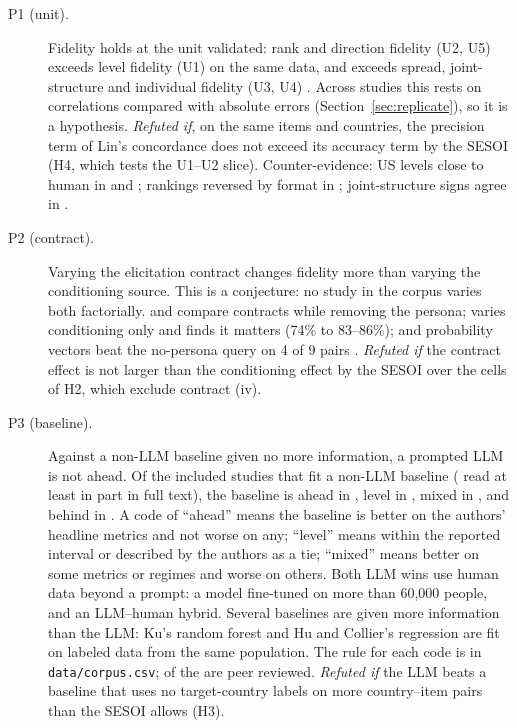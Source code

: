 \documentclass[11pt]{article}
\begin{document}
\begin{description}
  \item[P1 (unit).] Fidelity holds at the unit validated: rank and direction fidelity (U2, U5) exceeds level fidelity (U1) on the same data, and exceeds spread, joint-structure and individual fidelity (U3, U4) \citep{wang2026ess,williams2026beyond,ashokkumar2026,kim2026korean}. Across studies this rests on correlations compared with absolute errors (Section~\ref{sec:replicate}), so it is a hypothesis. \emph{Refuted if}, on the same items and countries, the precision term of Lin's concordance does not exceed its accuracy term by the SESOI (H4, which tests the U1--U2 slice). Counter-evidence: US levels close to human in \citet{bisbee2024} and \citet{lam2026fast}; rankings reversed by format in \citet{wang2026ess}; joint-structure signs agree in \citet{lee2026openweight}.
  \item[P2 (contract).] Varying the elicitation contract changes fidelity more than varying the conditioning source. This is a conjecture: no study in the corpus varies both factorially. \citet{jang2026} and \citet{doudkin2026} compare contracts while removing the persona; \citet{park2024} varies conditioning only and finds it matters (74\% to 83--86\%); and probability vectors beat the no-persona query on 4 of 9 pairs \citep{doudkin2026}. \emph{Refuted if} the contract effect is not larger than the conditioning effect by the SESOI over the cells of H2, which exclude contract (iv).
  \item[P3 (baseline).] Against a non-LLM baseline given no more information, a prompted LLM is not ahead. Of the \cBase{} included studies that fit a non-LLM baseline (\cBaseReadOK{} read at least in part in full text), the baseline is ahead in \cBaseAhead{} \citep{chen2026synthetic,wang2026ess,ku2026,hu2024persona}, level in \cBaseLevel{} \citep{doudkin2026}, mixed in \cBaseMixed{} \citep{lukauskas2026,kim2026korean,kim2023augmented}, and behind in \cBaseLLM{} \citep{binz2025centaur,krsteski2025}. A code of ``ahead'' means the baseline is better on the authors' headline metrics and not worse on any; ``level'' means within the reported interval or described by the authors as a tie; ``mixed'' means better on some metrics or regimes and worse on others. Both LLM wins use human data beyond a prompt: a model fine-tuned on more than 60,000 people, and an LLM--human hybrid. Several baselines are given more information than the LLM: Ku's random forest and Hu and Collier's regression are fit on labeled data from the same population. The rule for each code is in \nolinkurl{data/corpus.csv}; \cBasePeer{} of the \cBase{} are peer reviewed. \emph{Refuted if} the LLM beats a baseline that uses no target-country labels on more country--item pairs than the SESOI allows (H3).

\end{description}
\end{document}
